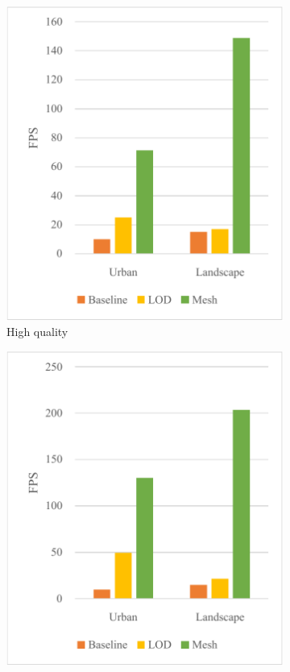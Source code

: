 \begin{figure}[h]
    \centering
    
    \begin{subfigure}{0.3\textwidth}
        \centering
        \includegraphics[width=\textwidth]{graph-fps-high.pdf}
        \caption{High quality}
    \end{subfigure}
    \begin{subfigure}{0.3\textwidth}
        \centering
        \includegraphics[width=\textwidth]{graph-fps-med.pdf}

\end{subfigure}
\end{figure}

